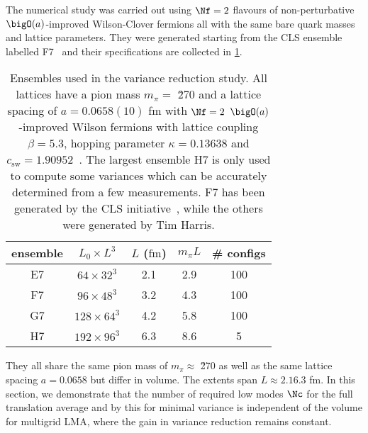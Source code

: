 The numerical study was carried out using $\Nf=2$ flavours of non-perturbative $\bigO(a)$-improved Wilson-Clover fermions all with the same bare quark masses and lattice parameters.
They were generated starting from the CLS ensemble labelled F7~\cite{online:cls} and their specifications are collected in \cref{tab:mglma:ensembles}.
\begin{table}[t]
\centering
\begin{tabular}{ccccc}
\toprule
{ensemble}&
{$L_0 \times L^3$}&
{$L$ ($\mathrm{fm}$)}&
{$m_{\pi} L$}&
{\# configs} \\
\midrule
E7 & $64  \times 32^3$ & 2.1 & 2.9 & 100 \\
F7 & $96  \times 48^3$ & 3.2 & 4.3 & 100 \\
G7 & $128 \times 64^3$ & 4.2 & 5.8 & 100 \\
H7 & $192 \times 96^3$ & 6.3 & 8.6 & 5   \\
\bottomrule
\end{tabular}
\caption{\label{tab:mglma:ensembles}%
Ensembles used in the variance reduction study.
All lattices have a pion mass $m_{\pi} = $ \u{270}{\MeV} and a lattice spacing of $a = 0.0658(10)$ fm with $\Nf=2$ $\bigO(a)$-improved Wilson fermions with lattice coupling $\beta=5.3$, hopping parameter $\kappa=0.13638$ and $c_\mathrm{sw} = 1.90952$~\cite{online:cls,Jansen:1998mx}.
The largest ensemble H7 is only used to compute some variances which can be accurately determined from a few measurements.
F7 has been generated by the CLS initiative~\cite{online:cls}, while the others were generated by Tim Harris.
}
\end{table}
They all share the same pion mass of $m_{\pi} \approx $ \u{270}{\MeV} as well as the same lattice spacing $a = 0.0658$ but differ in volume.
The extents span $L \approx 2.1 6.3$ fm.
In this section, we demonstrate that the number of required low modes $\Nc$ for the full translation average and by this for minimal variance is independent of the volume for multigrid LMA, where the gain in variance reduction remains constant.

